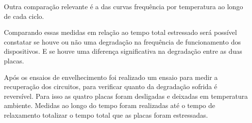 Outra comparação relevante é a das curvas frequência por temperatura ao longo de cada ciclo.

Comparando essas medidas em relação ao tempo total estressado será possível constatar se houve ou não uma degradação na frequência de funcionamento dos dispositivos. E se houve uma diferença significativa na degradação entre as duas placas.

Após os ensaios de envelhecimento foi realizado um ensaio para medir a recuperação dos circuitos, para verificar quanto da degradação sofrida é reversível. Para isso as quatro placas foram desligadas e deixadas em temperatura ambiente. Medidas ao longo do tempo foram realizadas até o tempo de relaxamento totalizar o tempo total que as placas foram estressadas.
